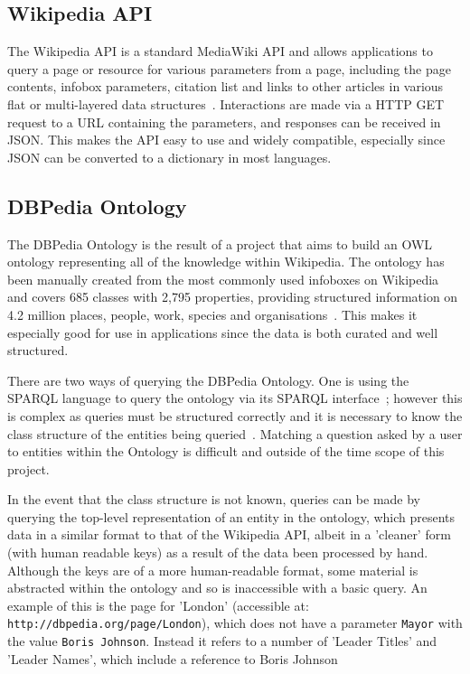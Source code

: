 \documentclass[authoryearcitations]{UoYCSproject}
\begin{document}
\subsection{Wikipedia API}
The Wikipedia API is a standard MediaWiki API and allows applications to query a page or resource for various parameters from a page, including the page contents, infobox parameters, citation list and links to other articles in various flat or multi-layered data structures~\cite{mediaWikiAPI}.  Interactions are made via a HTTP GET request to a URL containing the parameters, and responses can be received in JSON.  This makes the API easy to use and widely compatible, especially since JSON can be converted to a dictionary in most languages.

\subsection{DBPedia Ontology}
\label{subsec:dbpediaOntology}
The DBPedia Ontology is the result of a project that aims to build an OWL ontology representing all of the knowledge within Wikipedia.  The ontology has been manually created from the most commonly used infoboxes on Wikipedia and covers 685 classes with 2,795 properties, providing structured information on 4.2 million places, people, work, species and organisations~\cite{dbPediaIntro}.  This makes it especially good for use in applications since the data is both curated and well structured.

There are two ways of querying the DBPedia Ontology.  One is using the SPARQL language to query the ontology via its SPARQL interface~\cite{dbPediaSparql}; however this is complex as queries must be structured correctly and it is necessary to know the class structure of the entities being queried~\cite{dbPediaSparql}. Matching a question asked by a user to entities within the Ontology is difficult and outside of the time scope of this project.

In the event that the class structure is not known, queries can be made by querying the top-level representation of an entity in the ontology, which presents data in a similar format to that of the Wikipedia API, albeit in a 'cleaner' form (with human readable keys) as a result of the data been processed by hand.  Although the keys are of a more human-readable format, some material is abstracted within the ontology and so is inaccessible with a basic query.  An example of this is the page for 'London' (accessible at: \texttt{http://dbpedia.org/page/London}), which does not have a parameter \texttt{Mayor} with the value \texttt{Boris Johnson}.  Instead it refers to a number of 'Leader Titles' and 'Leader Names', which include a reference to Boris Johnson
\end{document}
